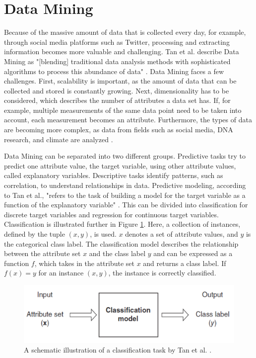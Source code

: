 \section{Data Mining}
Because of the massive amount of data that is collected every day, for example, through social media platforms such as Twitter, processing and extracting information becomes more valuable and challenging. Tan et al. describe Data Mining as "[blending] traditional data analysis methods with sophisticated algorithms to process this abundance of data" \cite[p.~21]{DBLP:books/aw/TanSKK2019}. Data Mining faces a few challenges. First, scalability is important, as the amount of data that can be collected and stored is constantly growing. Next, dimensionality has to be considered, which describes the number of attributes a data set has. If, for example, multiple measurements of the same data point need to be taken into account, each measurement becomes an attribute. Furthermore, the types of data are becoming more complex, as data from fields such as social media, DNA research, and climate are analyzed \cite{DBLP:books/aw/TanSKK2019}.

Data Mining can be separated into two different groups. Predictive tasks try to predict one attribute value, the target variable, using other attribute values, called explanatory variables. Descriptive tasks identify patterns, such as correlation, to understand relationships in data. Predictive modeling, according to Tan et al., "refers to the task of building a model for the target variable as a function of the explanatory variable" \cite[p.~29]{DBLP:books/aw/TanSKK2019}. This can be divided into classification for discrete target variables and regression for continuous target variables. Classification is illustrated further in Figure \ref{fig:classifiation}. Here, a collection of instances, defined by the tuple $(x,y)$, is used. $x$ denotes a set of attribute values, and $y$ is the categorical class label. The classification model describes the relationship between the attribute set $x$ and the class label $y$ and can be expressed as a function $f$, which takes in the attribute set $x$ and returns a class label. If $f(x) = y$ for an instance $(x,y)$, the instance is correctly classified.
\begin{figure}
    \centering
    \includegraphics[scale = 0.6]{Images/classification.png}
    \caption{A schematic illustration of a classification task by Tan et al. \cite[p.~134]{DBLP:books/aw/TanSKK2019}.}
    \label{fig:classifiation}
\end{figure}


